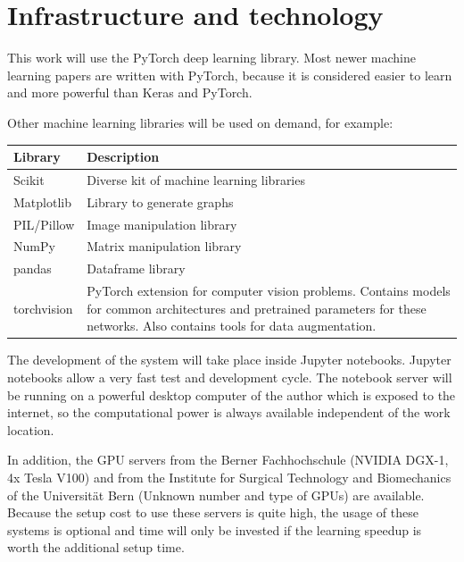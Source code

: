 \section{Infrastructure and technology}
This work will use the PyTorch\cite{paszke2017automatic} deep learning library. Most newer machine learning papers are written with PyTorch, because it is considered easier to learn and more powerful than Keras and PyTorch\cite{pytorchvstensorflow}.

Other machine learning libraries will be used on demand, for example:

\begin{tabular}{|p{3cm}|p{12.5cm}|}
    \hline
    \textbf{Library} & \textbf{Description} \\ \hline
    Scikit & Diverse kit of machine learning libraries \\ \hline
    Matplotlib & Library to generate graphs \\ \hline
    PIL/Pillow & Image manipulation library \\ \hline
    NumPy & Matrix manipulation library \\ \hline
    pandas & Dataframe library \\ \hline
    torchvision & PyTorch extension for computer vision problems. Contains models for common architectures and pretrained parameters for these networks. Also contains tools for data augmentation. \\ \hline
\end{tabular}

The development of the system will take place inside Jupyter notebooks. Jupyter notebooks allow a very fast test and development cycle. The notebook server will be running on a powerful desktop computer of the author which is exposed to the internet, so the computational power is always available independent of the work location.

In addition, the GPU servers from the Berner Fachhochschule (NVIDIA DGX-1, 4x Tesla V100) and from the Institute for Surgical Technology and Biomechanics of the Universität Bern (Unknown number and type of GPUs) are available. Because the setup cost to use these servers is quite high, the usage of these systems is optional and time will only be invested if the learning speedup is worth the additional setup time.

